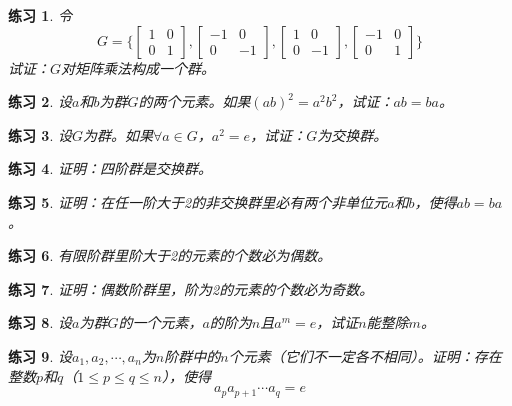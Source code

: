 \documentclass{article}
\newtheorem{Exercise}{练习}
\begin{document}
\begin{CJK*}{UTF8}{gbsn}
\begin{Exercise}
 令
 \[G=\bigg\{\begin{bmatrix}
  1&0\\0&1
 \end{bmatrix},
 \begin{bmatrix}
  -1&0\\0&-1
 \end{bmatrix},
 \begin{bmatrix}
  1&0\\0&-1
 \end{bmatrix},
 \begin{bmatrix}
  -1&0\\0&1
 \end{bmatrix}\bigg\}\] 
 试证：$G$对矩阵乘法构成一个群。
\end{Exercise}
\begin{Exercise}
  设$a$和$b$为群$G$的两个元素。如果$(ab)^2=a^2b^2$，试证：$ab=ba$。
\end{Exercise}
\begin{Exercise}
  设$G$为群。如果$\forall a\in G$，$a^2=e$，试证：$G$为交换群。
\end{Exercise}
\begin{Exercise}
  证明：四阶群是交换群。
\end{Exercise}
\begin{Exercise}
  证明：在任一阶大于2的非交换群里必有两个非单位元$a$和$b$，使得$ab=ba$。
\end{Exercise}
\begin{Exercise}
  有限阶群里阶大于2的元素的个数必为偶数。
\end{Exercise}
\begin{Exercise}
  证明：偶数阶群里，阶为2的元素的个数必为奇数。
\end{Exercise}
\begin{Exercise}
  设$a$为群$G$的一个元素，$a$的阶为$n$且$a^m=e$，试证$n$能整除$m$。
\end{Exercise}
\begin{Exercise}
  设$a_1,a_2,\cdots,a_n$为$n$阶群中的$n$个元素（它们不一定各不相同）。证明：存在整数$p$和$q$（$1\leq p \leq q \leq n$），使得
  \[a_pa_{p+1}\cdots a_q=e\]
\end{Exercise}
\end{CJK*}
\end{document}
